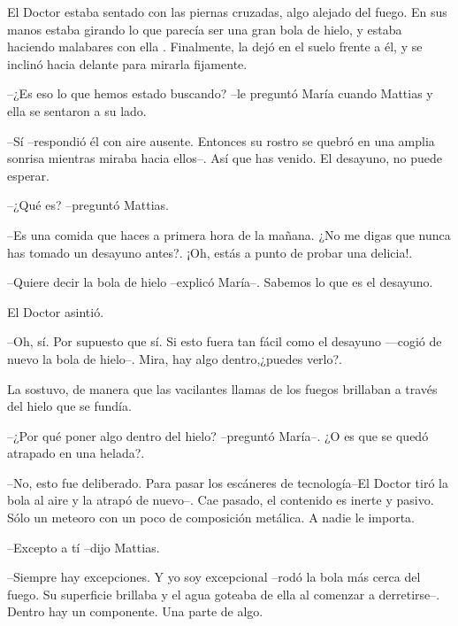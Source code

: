 El Doctor estaba sentado con las piernas cruzadas, algo alejado del fuego. En sus manos estaba girando lo que parecía ser una gran bola de hielo, y estaba haciendo malabares con ella . Finalmente, la dejó en el suelo frente a él, y se inclinó hacia delante para mirarla fijamente.



--¿Es eso lo que hemos estado buscando? --le preguntó María cuando Mattias y ella se sentaron a su lado.



--Sí --respondió él con aire ausente. Entonces su rostro se quebró en una amplia sonrisa mientras miraba hacia ellos--. Así que has venido. El desayuno, no puede esperar.



--¿Qué es? --preguntó Mattias.



--Es una comida que haces a primera hora de la mañana. ¿No me digas que nunca has tomado un desayuno antes?. ¡Oh, estás a punto de probar una delicia!.



--Quiere decir la bola de hielo --explicó María--. Sabemos lo que es el desayuno. 


El Doctor asintió. 


--Oh, sí. Por supuesto que sí. Si esto fuera tan fácil como el desayuno ---cogió de nuevo la bola de hielo--. Mira, hay algo dentro,¿puedes verlo?.



La sostuvo, de manera que las vacilantes llamas de los fuegos brillaban a través del hielo que se fundía.



--¿Por qué poner algo dentro del hielo? --preguntó  María--. ¿O es que se quedó atrapado en una helada?.



--No, esto fue deliberado. Para pasar los escáneres de tecnología--El Doctor tiró la bola al aire y la atrapó de nuevo--. Cae pasado, el contenido es inerte y pasivo. Sólo un meteoro con un poco de composición metálica. A nadie le importa. 



--Excepto a tí --dijo Mattias.



--Siempre hay excepciones. Y yo soy excepcional --rodó la bola más cerca del fuego. Su superficie brillaba y el agua goteaba de ella al comenzar a derretirse--. Dentro hay un componente. Una parte de algo.




